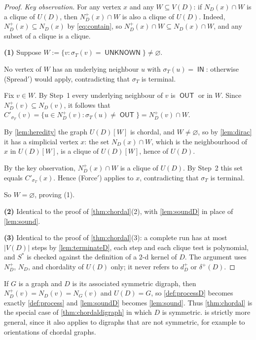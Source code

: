\documentclass[11pt]{article}
\numberwithin{equation}{section}
\theoremstyle{plain}
\newcommand{\V}{V}
\newcommand{\Np}{N^{+}}
\newcommand{\dip}{d^{+}}
\newcommand{\dmin}{\delta^{+}}
\newcommand{\und}{U}                       %
\newcommand{\st}{\sigma}                   %
\DeclareMathOperator{\IN}{\mathsf{IN}}
\DeclareMathOperator{\OUT}{\mathsf{OUT}}
\DeclareMathOperator{\UNK}{\mathsf{UNKNOWN}}
\begin{document}
\begin{proof}
\emph{Key observation.} For any vertex $x$ and any $W\subseteq\V(D)$: if $N_D(x)\cap W$
is a clique of $\und(D)$, then $\Np_D(x)\cap W$ is also a clique of $\und(D)$. Indeed,
$\Np_D(x)\subseteq N_D(x)$ by \eqref{eq:contain}, so $\Np_D(x)\cap W\subseteq N_D(x)\cap
W$, and any subset of a clique is a clique.

\textbf{(1)} Suppose $W:=\{v:\st_T(v)=\UNK\}\neq\varnothing$.

\begin{steps}
\item No vertex of $W$ has an underlying neighbour $u$ with $\st_T(u)=\IN$: otherwise
(Spread$'$) would apply, contradicting that $\st_T$ is terminal.

\item Fix $v\in W$. By Step~1 every underlying neighbour of $v$ is $\OUT$ or in $W$.
Since $\Np_D(v)\subseteq N_D(v)$, it follows that
$C'_{\st_T}(v)=\{u\in\Np_D(v):\st_T(u)\neq\OUT\}=\Np_D(v)\cap W$.

\item By \cref{lem:heredity} the graph $\und(D)[W]$ is chordal, and $W\neq\varnothing$,
so by \cref{lem:dirac} it has a simplicial vertex $x$: the set $N_D(x)\cap W$, which is
the neighbourhood of $x$ in $\und(D)[W]$, is a clique of $\und(D)[W]$, hence of
$\und(D)$.

\item By the key observation, $\Np_D(x)\cap W$ is a clique of $\und(D)$. By Step~2 this
set equals $C'_{\st_T}(x)$. Hence (Force$'$) applies to $x$, contradicting that $\st_T$
is terminal.
\end{steps}
So $W=\varnothing$, proving (1).

\textbf{(2)} Identical to the proof of \cref{thm:chordal}(2), with \cref{lem:soundD} in
place of \cref{lem:sound}.

\textbf{(3)} Identical to the proof of \cref{thm:chordal}(3): a complete run has at most
$|\V(D)|$ steps by \cref{lem:terminateD}, each step and each clique test is polynomial,
and $S^\ast$ is checked against the definition of a 2-d kernel of $D$. The argument uses
$\Np_D$, $N_D$, and chordality of $\und(D)$ only; it never refers to $\dip_D$ or
$\dmin(D)$.
\end{proof}

\begin{remark}\label{rem:recover}
If $G$ is a graph and $D$ is its associated symmetric digraph, then
$\Np_D(v)=N_D(v)=N_G(v)$ and $\und(D)=G$, so \cref{def:processD} becomes exactly
\cref{def:process} and \cref{lem:soundD} becomes \cref{lem:sound}. Thus
\cref{thm:chordal} is the special case of \cref{thm:chordaldigraph} in which $D$ is
symmetric.  is strictly more general, since it also applies to
digraphs that are not symmetric, for example to orientations of chordal graphs.
\end{remark}
\end{document}
